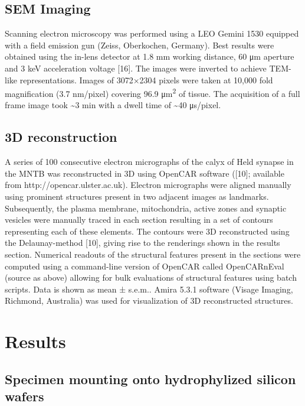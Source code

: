 \documentclass{article}
\begin{document}
\subsection*{SEM Imaging}

Scanning electron microscopy was performed using a LEO Gemini 1530 equipped with a field emission gun (Zeiss, Oberkochen, Germany). Best results were obtained using the in-lens detector at 1.8 mm working distance, 60 μm aperture and 3 keV acceleration voltage [16]. The images were inverted to achieve TEM-like representations. Images of 3072×2304 pixels were taken at 10,000 fold magnification (3.7 nm/pixel) covering 96.9 μm\textsuperscript{2} of tissue. The acquisition of a full frame image took \textasciitilde{}3 min with a dwell time of \textasciitilde{}40 μs/pixel.

\subsection*{3D reconstruction}

A series of 100 consecutive electron micrographs of the calyx of Held synapse in the MNTB was reconstructed in 3D using OpenCAR software ([10]; available from http://opencar.ulster.ac.uk). Electron micrographs were aligned manually using prominent structures present in two adjacent images as landmarks. Subsequently, the plasma membrane, mitochondria, active zones and synaptic vesicles were manually traced in each section resulting in a set of contours representing each of these elements. The contours were 3D reconstructed using the Delaunay-method [10], giving rise to the renderings shown in the results section. Numerical readouts of the structural features present in the sections were computed using a command-line version of OpenCAR called OpenCARnEval (source as above) allowing for bulk evaluations of structural features using batch scripts. Data is shown as mean ± s.e.m.. Amira 5.3.1 software (Visage Imaging, Richmond, Australia) was used for visualization of 3D reconstructed structures.

\section*{Results}

\subsection*{Specimen mounting onto hydrophylized silicon wafers}
\end{document}

